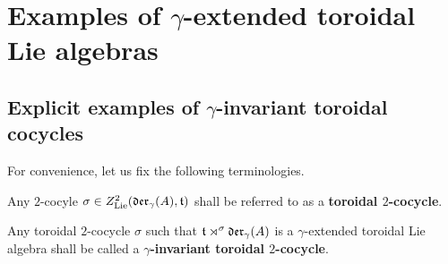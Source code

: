 \section{Examples of \texorpdfstring{$\gamma$}{}-extended toroidal Lie algebras}
    \subsection{Explicit examples of $\gamma$-invariant toroidal cocycles}
        For convenience, let us fix the following terminologies.
        \begin{definition} \label{def: yangian_toroidal_cocycles}
            Any $2$-cocyle $\sigma \in Z^2_{\mathrm{Lie}}(\mathfrak{der}_{\gamma}(A), \mathfrak{t})$ shall be referred to as a \textbf{toroidal $2$-cocycle}.
            
            Any toroidal $2$-cocycle $\sigma$ such that $\mathfrak{t} \rtimes^{\sigma} \mathfrak{der}_{\gamma}(A)$ is a $\gamma$-extended toroidal Lie algebra shall be called a \textbf{$\gamma$-invariant toroidal $2$-cocycle}.
        \end{definition}
        
